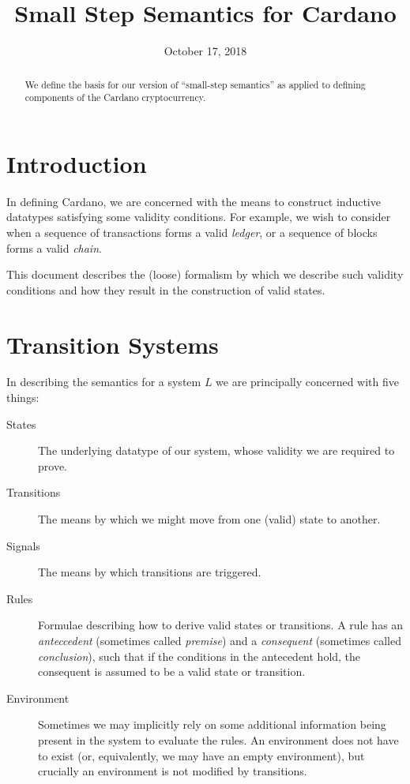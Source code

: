 \documentclass[11pt,a4paper]{article}
\theoremstyle{definition}
\theoremstyle{remark}
\begin{document}
\title{Small Step Semantics for Cardano}
\author{}
\date{October 17, 2018}

\maketitle

\begin{abstract}
We define the basis for our version of ``small-step semantics'' as applied to
defining components of the Cardano cryptocurrency.
\end{abstract}

\section{Introduction}
\label{sec:introduction}

In defining Cardano, we are concerned with the means to construct inductive
datatypes satisfying some validity conditions. For example, we wish to consider
when a sequence of transactions forms a valid \textit{ledger}, or a sequence of
blocks forms a valid \textit{chain}.

This document describes the (loose) formalism by which we describe such validity
conditions and how they result in the construction of valid states.

\section{Transition Systems}
\label{sec:preliminaries}

In describing the semantics for a system $L$ we are principally concerned with
five things:

\begin{description}
\item [States] The underlying datatype of our system, whose validity we are
  required to prove.
\item [Transitions] The means by which we might move from one (valid) state to
  another.
\item [Signals] The means by which transitions are triggered.
\item [Rules] Formulae describing how to derive valid states or transitions. A
  rule has an \textit{anteccedent} (sometimes called \textit{premise}) and a
  \textit{consequent} (sometimes called \textit{conclusion}), such that if the
  conditions in the antecedent hold, the consequent is assumed to be a valid
  state or transition.
\item [Environment] Sometimes we may implicitly rely on some additional
  information being present in the system to evaluate the rules. An environment
  does not have to exist (or, equivalently, we may have an empty environment),
  but crucially an environment is not modified by transitions.
\end{description}
\end{document}
